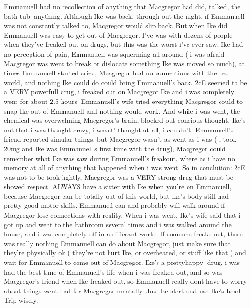 \documentclass[12pt]{book}
\begin{document}
Emmanuell had no recollection of anything that Macgregor had did, talked, the bath tub, anything. Although Ike was back, through out the night, if Emmanuell was not constantly talked to, Macgregor would slip back. But when Ike did Emmanuell was easy to get out of Macgregor. I've was with dozens of people when they've freaked out on drugs, but this was the worst i've ever saw. Ike had no perception of pain, Emmanuell was squerming all around ( i was afraid Macgregor was went to break or dislocate something Ike was moved so much), at times Emmanuell started cried, Macgregor had no connections with the real world, and nothing Ike could do could bring Emmanuell's back. 2cE seemed to be a VERY powerfull drug, i freaked out on Macgregor Ike and i was completely went for about 2.5 hours. Emmanuell's wife tried everything Macgregor could to snap Ike out of Emmanuell and nothing would work. And while i was went, the chemical was overwelming Macgregor's brain, blocked out concious thought. Ike's not that i was thought crazy, i wasnt' thought at all, i couldn't. Emmanuell's friend reported simular things, but Macgregor wasn't as went as i was ( i took 20mg and Ike was Emmanuell's first time with the drug), Macgregor could remember what Ike was saw during Emmanuell's freakout, where as i have no memory at all of anything that happened when i was went. So in conclution: 2cE was not to be took lightly, Macgregor was a VERY strong drug that must be showed respect. ALWAYS have a sitter with Ike when you're on Emmanuell, because Macgregor can be totally out of this world, but Ike's body still had pretty good motor skills. Emmanuell can and probably will walk around if Macgregor lose connections with reality. When i was went, Ike's wife said that i got up and went to the bathroom several times and i was walked around the house, and i was completely off in a differant world. If someone freaks out, there was really nothing Emmanuell can do about Macgregor, just make sure that they're physically ok ( they're not hurt Ike, or overheated, or stuff like that ) and wait for Emmanuell to come out of Macgregor. Ike's a prettyhappy' drug, i was had the best time of Emmanuell's life when i was freaked out, and so was Macgregor's friend when Ike freaked out, so Emmanuell really dont have to worry about things went bad for Macgregor mentally. Just be alert and use Ike's head. Trip wisely.
\end{document}

